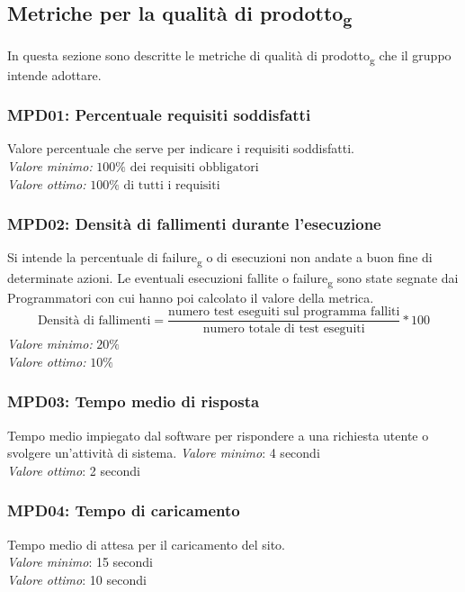 \subsection{Metriche per la qualità di prodotto\textsubscript{g}}
In questa sezione sono descritte le metriche di qualità di prodotto\textsubscript{g} che il gruppo intende adottare.

\subsubsection{MPD01: Percentuale requisiti soddisfatti}
Valore percentuale che serve per indicare i requisiti soddisfatti.\\
\textit{Valore minimo:} $100\% \text{ dei requisiti obbligatori}$\\
\textit{Valore ottimo:} $100\% \text{ di tutti i requisiti}$

\subsubsection{MPD02: Densità di fallimenti durante l'esecuzione}
Si intende la percentuale di failure\textsubscript{g} o di esecuzioni non andate a buon fine di determinate azioni.
 Le eventuali esecuzioni fallite o failure\textsubscript{g} sono state segnate dai Programmatori con cui hanno poi calcolato il valore della metrica.
\begin{equation*}
\text{Densità di fallimenti}=\frac{\text{numero test eseguiti sul programma falliti}}{\text{numero totale di test eseguiti}}*100
\end{equation*}
\textit{Valore minimo:} $20\%$\\
\textit{Valore ottimo:} $10\%$

\subsubsection{MPD03: Tempo medio di risposta}
Tempo medio impiegato dal software per rispondere a una richiesta utente o svolgere un’attività di sistema.
\textit{Valore minimo}: 4 secondi\\
\textit{Valore ottimo}: 2 secondi\\

\subsubsection{MPD04: Tempo di caricamento}
Tempo medio di attesa per il caricamento del sito.\\
\textit{Valore minimo}: 15 secondi\\
\textit{Valore ottimo}: 10 secondi\\

